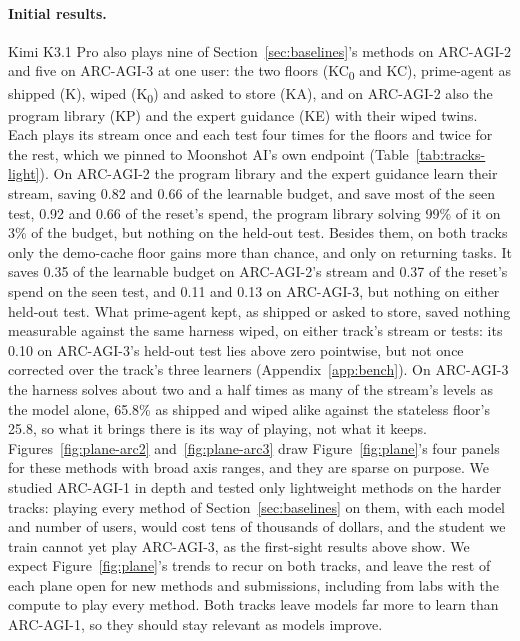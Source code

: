 \paragraph{Initial results.} Kimi K3.1 Pro also plays nine of Section~\ref{sec:baselines}'s methods on ARC-AGI-2 and five on ARC-AGI-3 at one user: the two floors (KC\textsubscript{0} and KC), prime-agent as shipped (K), wiped (K\textsubscript{0}) and asked to store (KA), and on ARC-AGI-2 also the program library (KP) and the expert guidance (KE) with their wiped twins. Each plays its stream once and each test four times for the floors and twice for the rest, which we pinned to Moonshot AI's own endpoint (Table~\ref{tab:tracks-light}). On ARC-AGI-2 the program library and the expert guidance learn their stream, saving 0.82 and 0.66 of the learnable budget, and save most of the seen test, 0.92 and 0.66 of the reset's spend, the program library solving 99\% of it on 3\% of the budget, but nothing on the held-out test. Besides them, on both tracks only the demo-cache floor gains more than chance, and only on returning tasks. It saves 0.35 of the learnable budget on ARC-AGI-2's stream and 0.37 of the reset's spend on the seen test, and 0.11 and 0.13 on ARC-AGI-3, but nothing on either held-out test. What prime-agent kept, as shipped or asked to store, saved nothing measurable against the same harness wiped, on either track's stream or tests: its 0.10 on ARC-AGI-3's held-out test lies above zero pointwise, but not once corrected over the track's three learners (Appendix~\ref{app:bench}). On ARC-AGI-3 the harness solves about two and a half times as many of the stream's levels as the model alone, 65.8\% as shipped and wiped alike against the stateless floor's 25.8, so what it brings there is its way of playing, not what it keeps. Figures~\ref{fig:plane-arc2} and~\ref{fig:plane-arc3} draw Figure~\ref{fig:plane}'s four panels for these methods with broad axis ranges, and they are sparse on purpose. We studied ARC-AGI-1 in depth and tested only lightweight methods on the harder tracks: playing every method of Section~\ref{sec:baselines} on them, with each model and number of users, would cost tens of thousands of dollars, and the student we train cannot yet play ARC-AGI-3, as the first-sight results above show. We expect Figure~\ref{fig:plane}'s trends to recur on both tracks, and leave the rest of each plane open for new methods and submissions, including from labs with the compute to play every method. Both tracks leave models far more to learn than ARC-AGI-1, so they should stay relevant as models improve.

